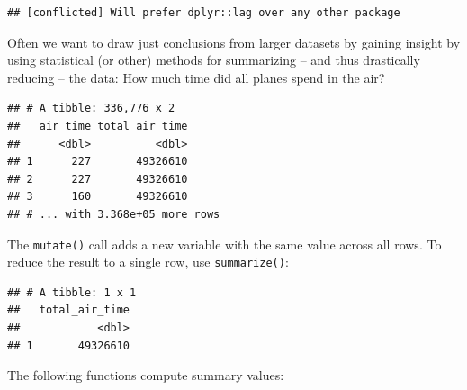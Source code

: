 \documentclass[]{book}
\newenvironment{Shaded}{}{}
\newcommand{\DataTypeTok}[1]{#1}
\newcommand{\KeywordTok}[1]{\textcolor[rgb]{0.00,0.00,1.00}{#1}}
\newcommand{\NormalTok}[1]{#1}
\newcommand{\OperatorTok}[1]{#1}
\newcommand{\OtherTok}[1]{\textcolor[rgb]{1.00,0.25,0.00}{#1}}
\newcommand{\StringTok}[1]{\textcolor[rgb]{0.00,0.50,0.50}{#1}}
\begin{document}
\begin{verbatim}
## [conflicted] Will prefer dplyr::lag over any other package
\end{verbatim}

Often we want to draw just conclusions from larger datasets by gaining insight by using statistical (or other) methods for summarizing -- and thus drastically reducing -- the data:
How much time did all planes spend in the air?

\begin{Shaded}
\end{Shaded}

\begin{verbatim}
## # A tibble: 336,776 x 2
##   air_time total_air_time
##      <dbl>          <dbl>
## 1      227       49326610
## 2      227       49326610
## 3      160       49326610
## # ... with 3.368e+05 more rows
\end{verbatim}

The \texttt{mutate()} call adds a new variable with the same value across all rows.
To reduce the result to a single row, use \texttt{summarize()}:

\begin{Shaded}
\end{Shaded}

\begin{verbatim}
## # A tibble: 1 x 1
##   total_air_time
##            <dbl>
## 1       49326610
\end{verbatim}

The following functions compute summary values:
\end{document}
